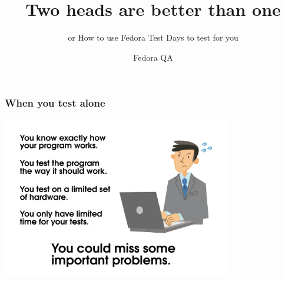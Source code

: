 \documentclass[12pt]{beamer}
\begin{document}
	\author{Fedora QA}
	\title{Two heads are better than one}
	\subtitle{or How to use Fedora Test Days to test for you}
	\date{}

\begin{frame}[plain]
	\maketitle
\end{frame}



\begin{frame}
\frametitle{When you test alone}
\begin{center}
	\includegraphics[width=10cm]{images/alone.png}
\end{center}
\end{frame}
\end{document}
